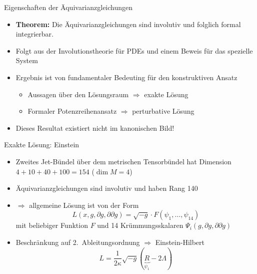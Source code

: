 \documentclass{beamer}
\begin{document}
    \begin{frame}{Eigenschaften der Äquivarianzgleichungen}
        \begin{itemize}
            \item \textbf{Theorem:} Die Äquivarianzgleichungen sind
            \alert{involutiv} und folglich \alert{formal integrierbar}. \pause
            \item Folgt aus der Involutionstheorie für PDEs und einem Beweis für das spezielle System \pause
            \item Ergebnis ist von fundamentaler Bedeuting für den konstruktiven Ansatz \pause
            \begin{itemize}
                \item Aussagen über den Lösungsraum $\Rightarrow$ exakte Lösung\pause
                \item Formaler Potenzreihenansatz $\Rightarrow$ perturbative Lösung \pause
            \end{itemize}
            \item Dieses Resultat existiert nicht im kanonischen Bild!
        \end{itemize}
    \end{frame}

    \begin{frame}{Exakte Lösung: Einstein}
        \begin{itemize}
            \item Zweites Jet-Bündel über dem metrischen Tensorbündel hat
            Dimension $4+10+40+100 = 154$ ($\operatorname{dim}M = 4$) \pause
            \item Äquivarianzgleichungen sind involutiv und haben Rang 140 \pause
            \item $\Rightarrow$ allgemeine Lösung ist von der Form
            \[ L(x,g,\partial g,\partial\partial g) = \sqrt{-g} \cdot F(\psi_1,\ldots,\psi_{14}) \]
            mit beliebiger Funktion $F$ und 14 Krümmungsskalaren $\Psi_i(g,\partial g,\partial\partial g)$ \pause
            \item Beschränkung auf 2.\ Ableitungsordnung $\Rightarrow$ \alert{Einstein-Hilbert}
            \[ L = \frac{1}{2\kappa}\sqrt{-g}(\underbrace{R}_{\psi_1} - 2\Lambda)\]
        \end{itemize}
    \end{frame}
\end{document}
